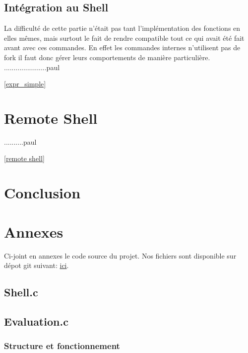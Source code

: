 \documentclass[12pt]{article}
\begin{document}
 \subsection{Intégration au Shell}
 
 La difficulté de cette partie n'était pas tant l'implémentation des fonctions en elles mêmes,
 mais surtout le fait de rendre compatible tout ce qui avait été fait avant avec ces commandes.
 En effet les commandes internes n'utilisent pas de fork il faut donc gérer leurs comportements
 de manière particulière.
 ......................paul
 
 \ref{expr_simple}
 

\newpage
\section{Remote Shell}

..........paul


\ref{remote shell}





\newpage
\section{Conclusion}



\newpage
\section{Annexes}

Ci-joint en annexes le code source du projet. Nos fichiers sont disponible sur dépot git suivant:
 \href{https://github.com/beziarum/shell.git}{ici}.

 
\subsection{Shell.c}
\label{main}
\begin{alltt}
 
\end{alltt}


\subsection{Evaluation.c}

\subsubsection{Structure et fonctionnement}
\label{struct et fonctionnement}
\begin{alltt}
 
\end{alltt}
\end{document}
